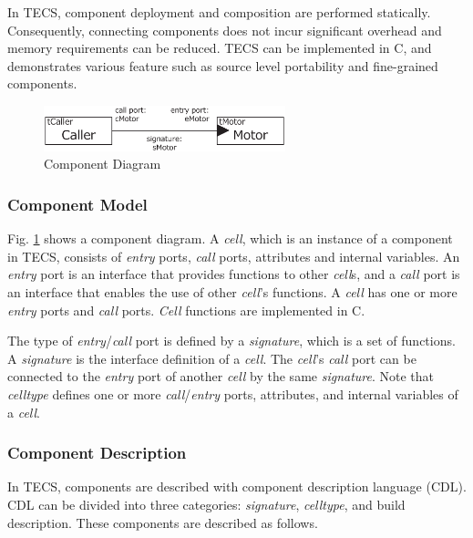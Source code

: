 \documentclass[conference]{IEEEtran/IEEEtran}
\begin{document}
In TECS, component deployment and composition are performed statically.
Consequently, connecting components does not incur significant overhead and memory requirements can be reduced.
TECS can be implemented in C, and demonstrates various feature such as source level portability and fine-grained components.

\begin{figure}[t]
    \centering
    \includegraphics[width=7.0cm,clip]{figure/component_diagram.eps}
    \caption{Component Diagram}
    \label{fig:component}
\end{figure}

\subsubsection{Component Model}

Fig. \ref{fig:component} shows a component diagram.
A {\it cell}, which is an instance of a component in TECS, consists of {\it entry} ports, {\it call} ports, attributes and internal variables.
An {\it entry} port is an interface that provides functions to other {\it cell}s, and a {\it call} port is an interface that enables the use of other {\it cell}'s functions.
A {\it cell} has one or more {\it entry} ports and {\it call} ports.
{\it Cell} functions are implemented in C.

The type of {\it entry}/{\it call} port is defined by a {\it signature}, which is a set of functions.
A {\it signature} is the interface definition of a {\it cell}.
The {\it cell}'s  {\it call} port can be connected to the {\it entry} port of another {\it cell} by the same {\it signature}.
Note that {\it celltype} defines one or more {\it call}/{\it entry} ports, attributes, and internal variables of a {\it cell}.

\subsubsection{Component Description}

In TECS, components are described with component description language (CDL).
CDL can be divided into three categories: {\it signature}, {\it celltype}, and build description.
These components are described as follows.
\end{document}
